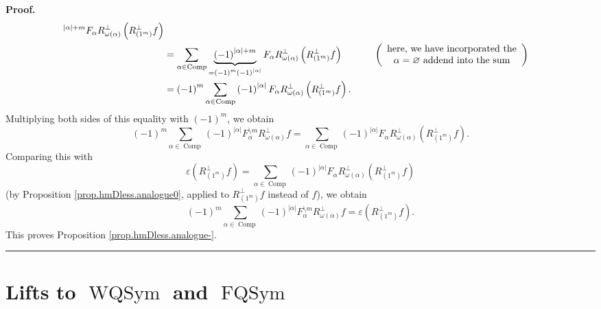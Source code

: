 \documentclass[numbers=enddot,12pt,final,onecolumn,notitlepage,abstracton]{scrartcl}%
\theoremstyle{definition}
\newenvironment{proof}[1][Proof]{\noindent\textbf{#1.} }{\ \rule{0.5em}{0.5em}}
\newenvironment{verlong}{}{}
\let\sumnonlimits\sum
\renewcommand{\sum}{\sumnonlimits\limits}
\begin{document}
\begin{verlong}
\begin{proof}
\begin{align*}
^{\left\vert \alpha\right\vert +m}F_{\alpha}R_{\omega\left(  \alpha\right)
}^{\perp}\left(  R_{\left(  1^{m}\right)  }^{\perp}f\right) \\
&  =\sum_{\alpha\in\operatorname*{Comp}}\underbrace{\left(  -1\right)
^{\left\vert \alpha\right\vert +m}}_{=\left(  -1\right)  ^{m}\left(
-1\right)  ^{\left\vert \alpha\right\vert }}F_{\alpha}R_{\omega\left(
\alpha\right)  }^{\perp}\left(  R_{\left(  1^{m}\right)  }^{\perp}f\right)
\ \ \ \ \ \ \ \ \ \ \left(
\begin{array}
[c]{c}%
\text{here, we have incorporated the}\\
\alpha=\varnothing\text{ addend into the sum}%
\end{array}
\right) \\
&  =\left(  -1\right)  ^{m}\sum_{\alpha\in\operatorname*{Comp}}\left(
-1\right)  ^{\left\vert \alpha\right\vert }F_{\alpha}R_{\omega\left(
\alpha\right)  }^{\perp}\left(  R_{\left(  1^{m}\right)  }^{\perp}f\right)  .
\end{align*}
Multiplying both sides of this equality with $\left(  -1\right)  ^{m}$, we
obtain%
\[
\left(  -1\right)  ^{m}\sum_{\alpha\in\operatorname*{Comp}}\left(  -1\right)
^{\left\vert \alpha\right\vert }F_{\alpha}^{\setminus m}R_{\omega\left(
\alpha\right)  }^{\perp}f=\sum_{\alpha\in\operatorname*{Comp}}\left(
-1\right)  ^{\left\vert \alpha\right\vert }F_{\alpha}R_{\omega\left(
\alpha\right)  }^{\perp}\left(  R_{\left(  1^{m}\right)  }^{\perp}f\right)  .
\]
Comparing this with%
\[
\varepsilon\left(  R_{\left(  1^{m}\right)  }^{\perp}f\right)  =\sum
_{\alpha\in\operatorname*{Comp}}\left(  -1\right)  ^{\left\vert \alpha
\right\vert }F_{\alpha}R_{\omega\left(  \alpha\right)  }^{\perp}\left(
R_{\left(  1^{m}\right)  }^{\perp}f\right)
\]
(by Proposition \ref{prop.hmDless.analogue0}, applied to $R_{\left(
1^{m}\right)  }^{\perp}f$ instead of $f$), we obtain%
\[
\left(  -1\right)  ^{m}\sum_{\alpha\in\operatorname*{Comp}}\left(  -1\right)
^{\left\vert \alpha\right\vert }F_{\alpha}^{\setminus m}R_{\omega\left(
\alpha\right)  }^{\perp}f=\varepsilon\left(  R_{\left(  1^{m}\right)  }%
^{\perp}f\right)  .
\]
This proves Proposition \ref{prop.hmDless.analogue-}.
\end{proof}
\end{verlong}

\section{\label{sect.WQSym}Lifts to $\operatorname*{WQSym}$ and
$\operatorname*{FQSym}$}
\end{document}
